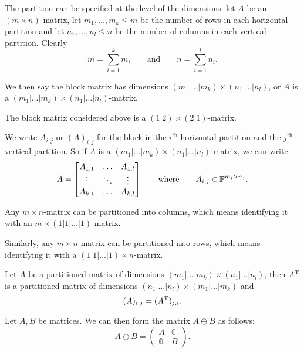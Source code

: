 The partition can be specified at the level of the dimensions: let $A$ be an $(m\times n)$-matrix, let $m_1,\ldots, m_k\leq m$ be the number of rows in each horizontal partition and let $n_1,\ldots, n_l\leq n$ be the number of columns in each vertical partition. Clearly
\[ m = \sum_{i=1}^k m_i \qquad \text{and} \qquad n = \sum_{i=1}^l n_i. \]

We then say the block matrix has dimensions $(m_1|\ldots|m_k) \times (n_1|\ldots|n_l)$, or $A$ is a $(m_1|\ldots|m_k) \times (n_1|\ldots|n_l)$-matrix.

\begin{example}
The block matrix considered above is a $(1|2)\times (2|1)$-matrix.
\end{example}

We write $A_{i,j}$ or $(A)_{i,j}$ for the block in the $i^\text{th}$ horizontal partition and the $j^\text{th}$ vertical partition. So if $A$ is a $(m_1|\ldots|m_k) \times (n_1|\ldots|n_l)$-matrix, we can write
\[ A = \begin{bmatrix}
A_{1,1} & \hdots & A_{1,l} \\
\vdots & \ddots & \vdots \\
A_{k,1} & \hdots & A_{k,l}
\end{bmatrix} \qquad \text{where} \qquad A_{i,j}\in\mathbb{F}^{m_i\times n_j}. \]

Any $m\times n$-matrix can be partitioned into columns, which means identifying it with an $m\times (1|1|\ldots|1)$-matrix.

Similarly, any $m\times n$-matrix can be partitioned into rows, which means identifying it with a $(1|1|\ldots|1)\times n$-matrix.

\begin{proposition}
Let $A$ be a partitioned matrix of dimensions $(m_1|\ldots|m_k) \times (n_1|\ldots|n_l)$, then $A^{\mathrm{T}}$ is a partitioned matrix of dimensions $(n_1|\ldots|n_l) \times (m_1|\ldots|m_k)$ and
\[ (A)_{i,j} = (A^{\mathrm{T}})_{j,i}. \]
\end{proposition}

\begin{definition}
Let $A,B$ be matrices. We can then form the  matrix $A\oplus B$ as follows:
\[ A\oplus B = \begin{pmatrix}
A & \mathbb{0} \\ \mathbb{0} & B
\end{pmatrix}. \]
\end{definition}

